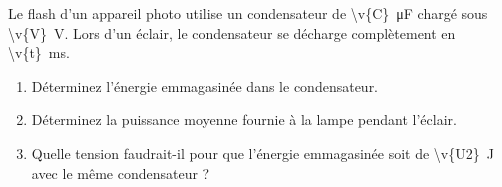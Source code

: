 Le flash d'un appareil photo utilise un condensateur de \qty{\v{C}}{\micro\farad} chargé sous \qty{\v{V}}{V}. Lors d'un éclair, le condensateur se décharge complètement en \qty{\v{t}}{ms}.

\begin{enumerate}[label=\alph*)]
    \item Déterminez l'énergie emmagasinée dans le condensateur.
    \item Déterminez la puissance moyenne fournie à la lampe pendant l'éclair.
    \item Quelle tension faudrait-il pour que l'énergie emmagasinée soit de \qty{\v{U2}}{J} avec le même condensateur ?
\end{enumerate}
